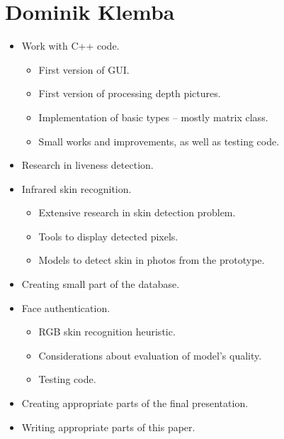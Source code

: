     \section{Dominik Klemba}
        \begin{itemize}
            \item Work with C++ code.
            \begin{itemize}
                \item First version of GUI.
                \item First version of processing depth pictures.
                \item Implementation of basic types -- mostly matrix class.
                \item Small works and improvements, as well as testing code.
            \end{itemize}
            \item Research in liveness detection.
            \item Infrared skin recognition.
            \begin{itemize}
                \item Extensive research in skin detection problem.
                \item Tools to display detected pixels.
                \item Models to detect skin in photos from the prototype.
            \end{itemize}
            \item Creating small part of the database.
            \item Face authentication.
            \begin{itemize}
                \item RGB skin recognition heuristic.
                \item Considerations about evaluation of model's quality.
                \item Testing code.
            \end{itemize}
            \item Creating appropriate parts of the final presentation.
            \item Writing appropriate parts of this paper.
        \end{itemize}

